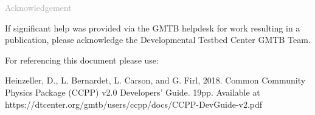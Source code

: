\begin{titlepage}
\vspace*{0.5cm}
\noindent

\begin{flushleft}
\textcolor{darkgray}{\LARGE Acknowledgement}
\vspace*{1cm}\par

If significant help was provided via the GMTB helpdesk for work resulting in a publication, please acknowledge the Developmental Testbed Center GMTB Team.\\
\vspace*{1cm}\par
For referencing this document please use:\\ 
\vspace*{1cm}\par
Heinzeller, D., L. Bernardet, L. Carson, and G. Firl, 2018. Common Community Physics Package (CCPP) v2.0 Developers' Guide. 19pp. Available at https://dtcenter.org/gmtb/users/ccpp/docs/CCPP-DevGuide-v2.pdf

\end{flushleft}
\end{titlepage}
\pagebreak{}





